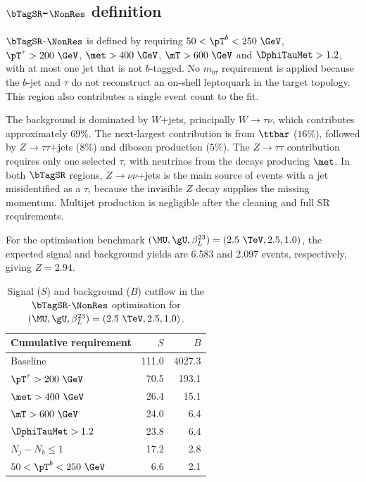 \clearpage
\subsection[SR1b-NonRes definition]{$\bTagSR$-$\NonRes$ definition}
\label{subsec:ch7_sr1b_nonres}
$\bTagSR$-$\NonRes$ is defined by requiring $50<\pT^b<250~\GeV$, $\pT^\tau>200~\GeV$, $\met>400~\GeV$, $\mT>600~\GeV$ and $\DphiTauMet>1.2$, with at most one jet that is not $b$-tagged.
No $m_{b\tau}$ requirement is applied because the $b$-jet and $\tau$ do not reconstruct an on-shell leptoquark in the target topology.
This region also contributes a single event count to the fit.

The background is dominated by $W$+jets, principally $W\to\tau\nu$, which contributes approximately $69\%$.
The next-largest contribution is from $\ttbar$ ($16\%$), followed by $Z\to\tau\tau$+jets ($8\%$) and diboson production ($5\%$).
The $Z\to\tau\tau$ contribution requires only one selected $\tau$, with neutrinos from the decays producing $\met$.
In both $\bTagSR$ regions, $Z\to\nu\nu$+jets is the main source of events with a jet misidentified as a $\tau$, because the invisible $Z$ decay supplies the missing momentum.
Multijet production is negligible after the cleaning and full SR requirements.

For the optimisation benchmark $(\MU,\gU,\beta_L^{23})=(2.5~\TeV,2.5,1.0)$, the expected signal and background yields are 6.583 and 2.097 events, respectively, giving $Z=2.94$.

\begin{table}[htbp]
    \centering
    \small
    \caption{Signal ($S$) and background ($B$) cutflow in the $\bTagSR$-$\NonRes$ optimisation for $(\MU,\gU,\beta_L^{23})=(2.5~\TeV,2.5,1.0)$.}
    \label{tab:ch7_cutflow_nonres}
    \begin{tabular}{lrr}
        \toprule
        Cumulative requirement & $S$ & $B$ \\
        \midrule
        Baseline & 111.0 & 4027.3 \\
        $\pT^\tau>200~\GeV$ & 70.5 & 193.1 \\
        $\met>400~\GeV$ & 26.4 & 15.1 \\
        $\mT>600~\GeV$ & 24.0 & 6.4 \\
        $\DphiTauMet>1.2$ & 23.8 & 6.4 \\
        $N_j-N_b\leq1$ & 17.2 & 2.8 \\
        $50<\pT^b<250~\GeV$ & 6.6 & 2.1 \\
        \bottomrule
    \end{tabular}
\end{table}

